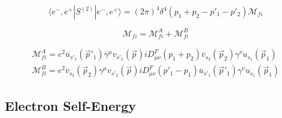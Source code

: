 \documentclass[a4]{article}
\begin{document}
        \begin{framed}

            \begin{equation}
                \langle e^{-}, e^{+} | S^{(2)} | e^{-}, e^{+} \rangle = (2 \pi)^4 \delta^4 (p_1 + p_2 - p'_1 - p'_2) \mathcal{M}_{fi}
            \end{equation}

            \begin{equation}
                \mathcal{M}_{fi} = \mathcal{M}_{fi}^{A} + \mathcal{M}_{fi}^{B}
            \end{equation}

            \begin{equation}
                \begin{aligned}
                    \mathcal{M}_{fi}^{A} = e^2 \overline{u}_{s'_1} (\vec{p}'_1) \gamma^{\mu} v_{s'_2} (\vec{p}) i D_{\mu \nu}^{F} (p_1 + p_2) \overline{v}_{s_2} (\vec{p}_2) \gamma^{\nu} u_{s_1} (\vec{p}_1) \\
                    \mathcal{M}_{fi}^{B} = e^2 \overline{v}_{s_2} (\vec{p}_2) \gamma^{\mu} v_{s'_2} (\vec{p}) i D_{\mu \nu}^{F} (p'_1 - p_1) \overline{u}_{s'_1} (\vec{p}'_1) \gamma^{\nu} u_{s_1} (\vec{p}_1)
                \end{aligned}
            \end{equation}
            
        \end{framed}

        \subsection{Electron Self-Energy}
\end{document}
